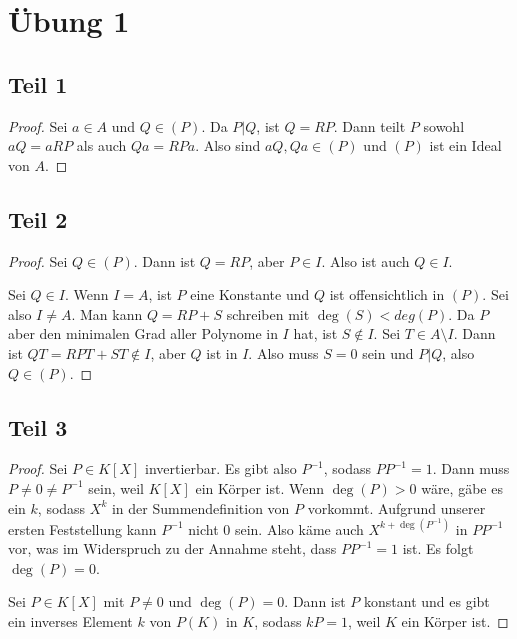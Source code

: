 \documentclass[10pt,a4paper]{article}
\begin{document}
\section*{Übung 1}

\subsection*{Teil 1}

\begin{proof}
Sei $a \in A$ und $Q \in (P)$.
Da $P | Q$, ist $Q = RP$.
Dann teilt $P$ sowohl $aQ = aRP$ als auch $Qa = RPa$.
Also sind $aQ, Qa \in (P)$ und $(P)$ ist ein Ideal von $A$.
\end{proof}

\subsection*{Teil 2}

\begin{proof}
Sei $Q \in (P)$.
Dann ist $Q = RP$, aber $P \in I$.
Also ist auch $Q \in I$.

Sei $Q \in I$.
Wenn $I = A$, ist $P$ eine Konstante und $Q$ ist offensichtlich in $(P)$.
Sei also $I \ne A$.
Man kann $Q = RP + S$ schreiben mit $\deg(S) < deg(P)$.
Da $P$ aber den minimalen Grad aller Polynome in $I$ hat, ist $S \notin I$.
Sei $T \in A \setminus I$.
Dann ist $QT = RPT + ST \notin I$, aber $Q$ ist in $I$.
Also muss $S = 0$ sein und $P | Q$, also $Q \in (P)$.
\end{proof}

\subsection*{Teil 3}

\begin{proof}
Sei $P \in K[X]$ invertierbar.
Es gibt also $P^{-1}$, sodass $PP^{-1} = 1$.
Dann muss $P \ne 0 \ne P^{-1}$ sein, weil $K[X]$ ein Körper ist.
Wenn $\deg(P) > 0$ wäre, gäbe es ein $k$, sodass $X^{k}$ in der Summendefinition von $P$ vorkommt.
Aufgrund unserer ersten Feststellung kann $P^{-1}$ nicht $0$ sein.
Also käme auch $X^{k + \deg(P^{-1})}$ in $PP^{-1}$ vor, was im Widerspruch zu der Annahme steht, dass $PP^{-1} = 1$ ist.
Es folgt $\deg(P) = 0$.

Sei $P \in K[X]$ mit $P \ne 0$ und $\deg(P) = 0$.
Dann ist $P$ konstant und es gibt ein inverses Element $k$ von $P(K)$ in $K$, sodass $kP = 1$, weil $K$ ein Körper ist.
\end{proof}
\end{document}
